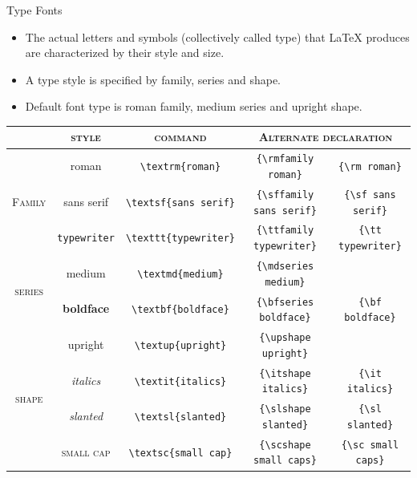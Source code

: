 \documentclass[style=lsuloni,orient=landscape]{powerdot}
\begin{document}
\begin{wideslide}[method=direct]{Type Fonts}
  \begin{itemize}
  \item The actual letters and symbols (collectively called type) that LaTeX produces are characterized by their style and size.
  \item A type style is specified by family, series and shape.
  \item Default font type is roman family, medium series and upright shape.
  \end{itemize}
  \begin{center}
    \begin{tabular}{|c|c|c|c|c|}
      \cline{2-5}
      \multicolumn{1}{c}{} & \multicolumn{1}{|c|}{\textsc{style}} & \multicolumn{1}{|c|}{\textsc{command}} & \multicolumn{2}{|c|}{\textsc{Alternate declaration}}\\
      \hline
      \multirow{3}{*}{\textsc{Family}} & \textrm{roman} & \lstinline|\textrm{roman}| & \lstinline|{\rmfamily roman}| & \lstinline|{\rm roman}|\\
      & \textsf{sans serif} & \lstinline|\textsf{sans serif}| & \lstinline|{\sffamily sans serif}| & \lstinline|{\sf sans serif}|\\
      & \texttt{typewriter} & \lstinline|\texttt{typewriter}| & \lstinline|{\ttfamily typewriter}| & \lstinline|{\tt typewriter}|\\
      \hline
      \multirow{2}{*}{\textsc{series}} & \textmd{medium} & \lstinline|\textmd{medium}| & \lstinline|{\mdseries medium}| & \\
      & \textbf{boldface} & \lstinline|\textbf{boldface}| & \lstinline|{\bfseries boldface}| & \lstinline|{\bf boldface}|\\
      \hline
      \multirow{4}{*}{\textsc{shape}} & \textup{upright} & \lstinline|\textup{upright}| & \lstinline|{\upshape upright}| & \\
      & \textit{italics} & \lstinline|\textit{italics}| & \lstinline|{\itshape italics}| & \lstinline|{\it italics}|\\
      & \textsl{slanted} & \lstinline|\textsl{slanted}| & \lstinline|{\slshape slanted}| & \lstinline|{\sl slanted}|\\
      & \textsc{small cap} & \lstinline|\textsc{small cap}| & \lstinline|{\scshape small caps}| & \lstinline|{\sc small caps}|\\
      \hline
    \end{tabular}
  \end{center}
\end{wideslide}
\end{document}
